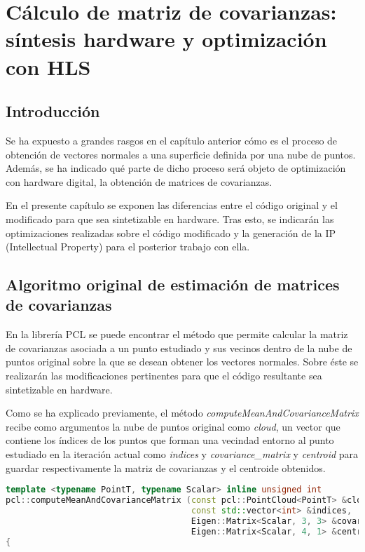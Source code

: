 \chapter{Cálculo de matriz de covarianzas: síntesis hardware y optimización con HLS}

\section{Introducción}
Se ha expuesto a grandes rasgos en el capítulo anterior cómo es el proceso de obtención de vectores normales a una superficie definida por una nube de puntos. Además, se ha indicado qué parte de dicho proceso será objeto de optimización con hardware digital, la obtención de matrices de covarianzas.

En el presente capítulo se exponen las diferencias entre el código original y el modificado para que sea sintetizable en hardware. Tras esto, se indicarán las optimizaciones realizadas sobre el código modificado y la generación de la IP (Intellectual Property) para el posterior trabajo con ella.




\section{Algoritmo original de estimación de matrices de covarianzas}

En la librería PCL se puede encontrar el método que permite calcular la matriz de covarianzas asociada a un punto estudiado y sus vecinos dentro de la nube de puntos original sobre la que se desean obtener los vectores normales\cite{calculo_covarianzas}. Sobre éste se realizarán las modificaciones pertinentes para que el código resultante sea sintetizable en hardware.

Como se ha explicado previamente, el método \textit{computeMeanAndCovarianceMatrix} recibe como argumentos la nube de puntos original como \textit{cloud}, un vector que contiene los índices de los puntos que forman una vecindad entorno al punto estudiado en la iteración actual como \textit{indices} y \textit{covariance\_matrix} y \textit{centroid} para guardar respectivamente la matriz de covarianzas y el centroide obtenidos.

\begin{lstlisting}[language=C++,breaklines]
  template <typename PointT, typename Scalar> inline unsigned int
pcl::computeMeanAndCovarianceMatrix (const pcl::PointCloud<PointT> &cloud,
                                     const std::vector<int> &indices,
                                     Eigen::Matrix<Scalar, 3, 3> &covariance_matrix,
                                     Eigen::Matrix<Scalar, 4, 1> &centroid)
{
\end{lstlisting}


